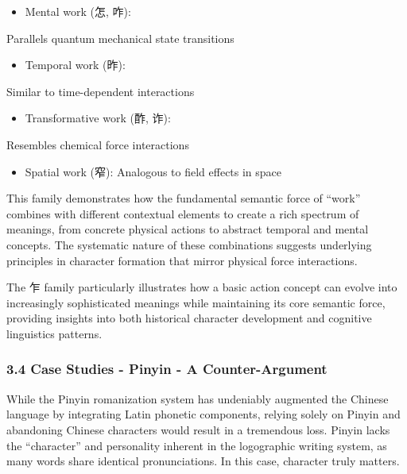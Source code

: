 \documentclass[
  11pt,
  letterpaper,
]{article}
\providecommand{\tightlist}{%
  \setlength{\itemsep}{0pt}\setlength{\parskip}{0pt}}
\begin{document}
\begin{itemize}
\tightlist
\item
  Mental work (怎, 咋):
\end{itemize}

Parallels quantum mechanical state transitions

\begin{itemize}
\tightlist
\item
  Temporal work (昨):
\end{itemize}

Similar to time-dependent interactions

\begin{itemize}
\tightlist
\item
  Transformative work (酢, 诈):
\end{itemize}

Resembles chemical force interactions

\begin{itemize}
\tightlist
\item
  Spatial work (窄): Analogous to field effects in space
\end{itemize}

This family demonstrates how the fundamental semantic force of ``work''
combines with different contextual elements to create a rich spectrum of
meanings, from concrete physical actions to abstract temporal and mental
concepts. The systematic nature of these combinations suggests
underlying principles in character formation that mirror physical force
interactions.

The 乍 family particularly illustrates how a basic action concept can
evolve into increasingly sophisticated meanings while maintaining its
core semantic force, providing insights into both historical character
development and cognitive linguistics patterns.

\hypertarget{case-studies---pinyin---a-counter-argument}{%
\subsubsection{3.4 Case Studies - Pinyin - A
Counter-Argument}\label{case-studies---pinyin---a-counter-argument}}

While the Pinyin romanization system has undeniably augmented the
Chinese language by integrating Latin phonetic components, relying
solely on Pinyin and abandoning Chinese characters would result in a
tremendous loss. Pinyin lacks the ``character'' and personality inherent
in the logographic writing system, as many words share identical
pronunciations. In this case, character truly matters.
\end{document}

